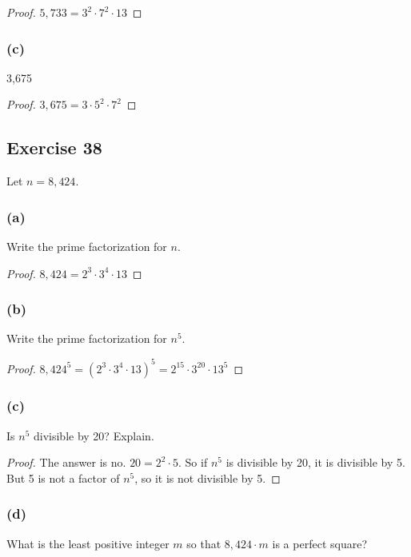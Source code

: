 \documentclass[14pt]{extarticle}
\begin{document}
\begin{proof}
    $5,733 = 3^2 \cdot 7^2 \cdot 13$
\end{proof}

\subsubsection{(c)}
3,675

\begin{proof}
    $3,675 = 3 \cdot 5^2 \cdot 7^2$
\end{proof}

\subsection{Exercise 38}
Let $n = 8,424$.

\subsubsection{(a)}
Write the prime factorization for $n$.

\begin{proof}
    $8,424 = 2^3 \cdot 3^4 \cdot 13$
\end{proof}

\subsubsection{(b)}
Write the prime factorization for $n^5$.

\begin{proof}
    $8,424^5 = (2^3 \cdot 3^4 \cdot 13)^5 = 2^{15} \cdot 3^{20} \cdot 13^5$
\end{proof}

\subsubsection{(c)}
Is $n^5$ divisible by 20? Explain.

\begin{proof}
    The answer is no. $20 = 2^2 \cdot 5$. So if $n^5$ is divisible by 20, it is divisible by 5. But 5 is not a factor of $n^5$, so it is not divisible by 5.
\end{proof}

\subsubsection{(d)}
What is the least positive integer $m$ so that $8,424\cdot m$ is a perfect square?
\end{document}

